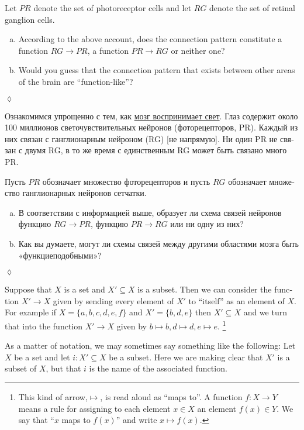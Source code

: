 \documentclass{book}
\def\to{\rightarrow}
\def\taking{\colon}
\def\ss{\subseteq}
\theoremstyle{theoremENG}
\theoremstyle{lemmaENG}
\theoremstyle{propositionENG}
\theoremstyle{corollaryENG}
\theoremstyle{factENG}
\theoremstyle{remarkENG}
\theoremstyle{exampleENG}
\newtheorem{exampleENG}[subsubsection]{\begin{english}Example\end{english}}
\theoremstyle{warningENG}
\theoremstyle{questionENG}
\theoremstyle{guessENG}
\theoremstyle{answerENG}
\theoremstyle{constructionENG}
\theoremstyle{rulesENG}
\theoremstyle{excENG}
\newtheorem{excENG}[subsubsection]{\begin{english}Exercise\end{english}}
\theoremstyle{appENG}
\theoremstyle{definitionENG}
\theoremstyle{notationENG}
\theoremstyle{conjectureENG}
\theoremstyle{postulateENG}
\newenvironment{exerciseENG}{\begin{excENG}}{\hspace*{\fill}$\lozenge$\end{excENG}}
\theoremstyle{theoremRUS}
\theoremstyle{lemmaRUS}
\theoremstyle{propositionRUS}
\theoremstyle{corollaryRUS}
\theoremstyle{factRUS}
\theoremstyle{remarkRUS}
\theoremstyle{exampleRUS}
\theoremstyle{warningRUS}
\theoremstyle{questionRUS}
\theoremstyle{guessRUS}
\theoremstyle{answerRUS}
\theoremstyle{constructionRUS}
\theoremstyle{rulesRUS}
\theoremstyle{excRUS}
\newtheorem{excRUS}[subsubsection]{\begin{russian}Упражнение\end{russian}}
\theoremstyle{appRUS}
\theoremstyle{definitionRUS}
\theoremstyle{notationRUS}
\theoremstyle{conjectureRUS}
\theoremstyle{postulateRUS}
\newenvironment{exerciseRUS}{\begin{excRUS}}{\hspace*{\fill}$\lozenge$\end{excRUS}}
\def\sexc{\begin{enumerate}[a.)]\setlength{\itemsep}{.1cm}\setlength{\parskip}{.1cm}\item}
\def\next{\item}
\def\endsexc{\end{enumerate}}
\begin{document}
\begin{english}
\begin{exerciseENG}
Let $PR$ denote the set of photoreceptor cells and let $RG$ denote the set of retinal ganglion cells. 
\sexc According to the above account, does the connection pattern constitute a function $RG\to PR$, a function $PR\to RG$ or neither one? 
\next Would you guess that the connection pattern that exists between other areas of the brain are “function-like”?
\endsexc
\end{exerciseENG}

\begin{exerciseRUS}
\begin{russian} 
Ознакомимся упрощенно с тем, как \href{https://ru.wikipedia.org/wiki/%D0%A1%D0%B5%D1%82%D1%87%D0%B0%D1%82%D0%BA%D0%B0}{\text мозг воспринимает свет}. Глаз содержит около 100 миллионов светочувствительных нейронов (фоторецепторов, PR). Каждый из них связан с ганглионарным нейроном (RG) [не напрямую]. Ни один PR не связан с двумя RG, в то же время с единственным RG может быть связано много PR.

Пусть $PR$ обозначает множество фоторецепторов и пусть $RG$ обозначает множество ганглионарных нейронов сетчатки. 
\sexc В соответствии с информацией выше, образует ли схема связей нейронов функцию $RG\to PR$, функцию $PR\to RG$ или ни одну из них? 
\next Как вы думаете, могут ли схемы связей между другими областями мозга быть «функциеподобными»? 
\endsexc 
\end{russian}
\end{exerciseRUS}

\begin{exampleENG}\label{ex:subset as function}
Suppose that $X$ is a set and $X'\ss X$ is a subset. Then we can consider the function $X'\to X$ given by sending every element of $X'$ to “itself” as an element of $X$. For example if $X=\{a,b,c,d,e,f\}$ and $X'=\{b,d,e\}$ then $X'\ss X$ and we turn that into the function $X'\to X$ given by $b\mapsto b, d\mapsto d, e\mapsto e$.
\footnote{This kind of arrow,\;\;$\mapsto$\;\;, is read aloud as “maps to”. A function $f\taking X\to Y$ means a rule for assigning to each element $x\in X$ an element $f(x)\in Y$. We say that “$x$ maps to $f(x)$” and write $x\mapsto f(x)$.}

As a matter of notation, we may sometimes say something like the following: Let $X$ be a set and let $i\taking X'\ss X$ be a subset. Here we are making clear that $X'$ is a subset of $X$, but that $i$ is the name of the associated function.
\end{exampleENG}


\end{english}
\end{document}
